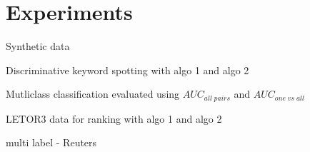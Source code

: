 

\section{Experiments}

Synthetic data

Discriminative keyword spotting with algo 1 and algo 2

Mutliclass classification evaluated using $AUC_{all \; pairs}$ and $AUC_{one \; vs \; all}$

LETOR3 data for ranking with algo 1 and algo 2

multi label - Reuters
